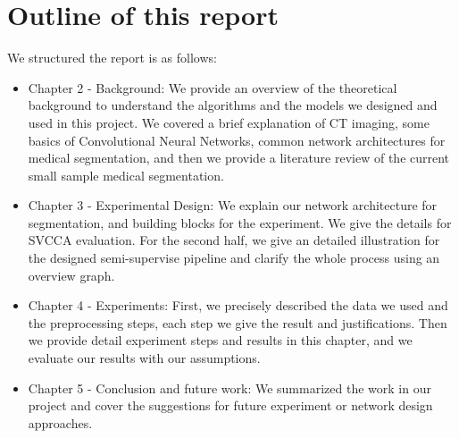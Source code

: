  
\newpage 

\section{Outline of this report}
We structured the report is as follows:
\begin{itemize}
	\item Chapter 2 - Background: We provide an overview of the theoretical background to understand the algorithms and the models we designed and used in this project. We covered a brief explanation of CT imaging, some basics of Convolutional Neural Networks, common network architectures for medical segmentation, and then we provide a literature review of the current small sample medical segmentation.
	\item Chapter 3 - Experimental Design: We explain our network architecture for segmentation, and building blocks for the experiment. We give the details for SVCCA evaluation. For the second half, we give an detailed illustration for the designed semi-supervise pipeline and clarify the whole process using an overview graph.
	\item Chapter 4 - Experiments: First, we precisely described the data we used and the preprocessing steps, each step we give the result and justifications. Then we provide detail experiment steps and results in this chapter, and we evaluate our results with our assumptions.
	\item Chapter 5 - Conclusion and future work: We summarized the work in our project and cover the suggestions for future experiment or network design approaches.
\end{itemize}


